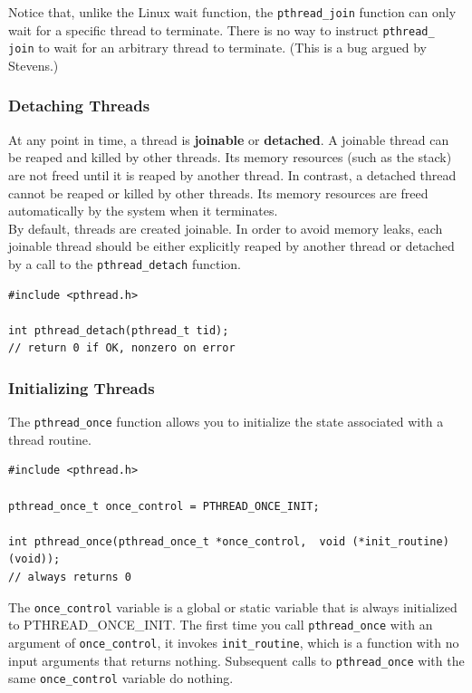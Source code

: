 \documentclass[11pt]{article}
\begin{document}
Notice that, unlike the Linux wait function, the \texttt{pthread\_join} function can only wait for a specific thread to terminate. There is no way to instruct \texttt{pthread\_ join} to wait for an arbitrary thread to terminate. (This is a bug argued by Stevens.)\\


\subsubsection{Detaching Threads}
\label{sec:org5b8dd88}
At any point in time, a thread is \textbf{joinable} or \textbf{detached}. A joinable thread can be reaped and killed by other threads. Its memory resources (such as the stack) are not freed until it is reaped by another thread. In contrast, a detached thread cannot be reaped or killed by other threads. Its memory resources are freed automatically by the system when it terminates.\\

By default, threads are created joinable. In order to avoid memory leaks, each joinable thread should be either explicitly reaped by another thread or detached by a call to the \texttt{pthread\_detach} function.\\

\begin{verbatim}
#include <pthread.h>

int pthread_detach(pthread_t tid);
// return 0 if OK, nonzero on error
\end{verbatim}

\subsubsection{Initializing Threads}
\label{sec:orgf513bb5}
The \texttt{pthread\_once} function allows you to initialize the state associated with a thread routine.\\

\begin{verbatim}
#include <pthread.h>

pthread_once_t once_control = PTHREAD_ONCE_INIT;

int pthread_once(pthread_once_t *once_control,  void (*init_routine)(void));
// always returns 0
\end{verbatim}

The \texttt{once\_control} variable is a global or static variable that is always initialized to PTHREAD\_ONCE\_INIT. The first time you call \texttt{pthread\_once} with an argument of \texttt{once\_control}, it invokes \texttt{init\_routine}, which is a function with no input arguments that returns nothing. Subsequent calls to \texttt{pthread\_once} with the same \texttt{once\_control} variable do nothing.\\
\end{document}
